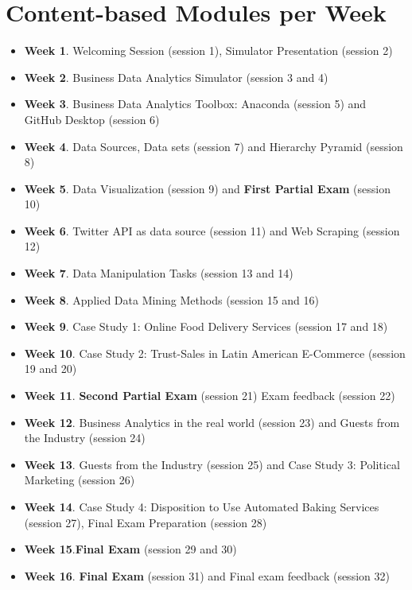 \documentclass[letterpaper,11pt]{article}
\begin{document}
\section{Content-based Modules per Week}
\begin{itemize}
\item \textbf{Week 1}. Welcoming Session (session 1), Simulator Presentation (session 2)
\item \textbf{Week 2}. Business Data Analytics Simulator (session 3 and 4)
\item \textbf{Week 3}. Business Data Analytics Toolbox: Anaconda (session 5) and GitHub Desktop (session 6)
\item \textbf{Week 4}. Data Sources, Data sets (session 7) and Hierarchy Pyramid (session 8)
\item \textbf{Week 5}. Data Visualization (session 9) and \textbf{First Partial Exam} (session 10)
\item \textbf{Week 6}. Twitter API as data source (session 11) and Web Scraping (session 12)
\item \textbf{Week 7}. Data Manipulation Tasks (session 13 and 14)
\item \textbf{Week 8}. Applied Data Mining Methods (session 15 and 16)
\item \textbf{Week 9}. Case Study 1: Online Food Delivery Services (session 17 and 18)
\item \textbf{Week 10}. Case Study 2: Trust-Sales in Latin American E-Commerce (session 19 and 20)
\item \textbf{Week 11}. \textbf{Second Partial Exam} (session 21) Exam feedback (session 22)
\item \textbf{Week 12}. Business Analytics in the real world (session 23) and Guests from the Industry (session 24)
\item \textbf{Week 13}. Guests from the Industry (session 25) and Case Study 3: Political Marketing (session 26)
\item \textbf{Week 14}. Case Study 4: Disposition to Use Automated Baking Services (session 27), Final Exam Preparation (session 28)
\item \textbf{Week 15}.\textbf{Final Exam} (session 29 and 30)
\item \textbf{Week 16}. \textbf{Final Exam} (session 31) and Final exam feedback (session 32)
\end{itemize}
\end{document}
